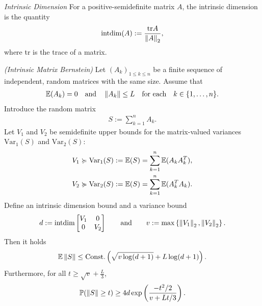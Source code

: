 \begin{definition}
  \emph{Intrinsic Dimension}
  For a positive-semidefinite matrix $A$,
  the intrinsic dimension is the quantity
  \begin{gather*}
    \text{intdim}
    (A)
    :=
    \frac{\text{tr}A}{\left\lVert A\right\rVert_2}
    ,
  \end{gather*}
  where tr is the trace of a matrix.
\end{definition}
\begin{theorem}
  \emph{(Intrinsic Matrix Bernstein)}
  \label{rmineq_bernstein}
  Let $(A_k)_{1\le k \le n}$  be a finite sequence of independent, random matrices with the same size. Assume that
    \begin{gather}
      \mathbb{E}(A_k)=0\quad\text{and}\quad\left\lVert A_k\right\rVert\le L \quad \text{for each}\quad  k\in \{1,\ldots,n\}.
    \end{gather}
  Introduce the random matrix
      \begin{gather*}
        S:=\sum_{k=1}^n A_k.
      \end{gather*}
  Let 
  $V_1$ 
  and
  $V_2$ 
  be semidefinite upper bounds for the matrix-valued variances
  $\text{Var}_1(S)$
  and
  $\text{Var}_2(S)$:
  \begin{align*}
    V_1 
    &\succcurlyeq 
    \text{Var}_1(S)
    :=
    \mathbb{E}(S)
    =
    \sum_{k = 1}^{n}
    \mathbb{E}(A_k A_k^T),\\
    V_2 
    &\succcurlyeq 
    \text{Var}_2(S)
    :=
    \mathbb{E}(S)
    =
    \sum_{k = 1}^{n}
    \mathbb{E}(A_k^T A_k)
    .
  \end{align*}
  Define an intrinsic dimension bound and a variance bound
  \begin{gather}
    \label{ rmineq_intrinsic_bernstein_intdim_var_bound }
    d
    :=
    \text{intdim}
    \begin{bmatrix}
      V_1 & 0 \\
      0   & V_2
    \end{bmatrix}
    \qquad
    \text{and}
    \qquad
    v
    :=
    \max
    \left\{ \left\lVert V_1\right\rVert_2, \left\lVert V_2\right\rVert_2 \right\}
    .
  \end{gather}
  Then 
  it holds
      \begin{align}
        \label{rmineq_intrinsic_bernstein_expectation_bound}
        \mathbb{E}\left\lVert S\right\rVert\le \text{Const.}\left( \sqrt{v\log(d+1)} + L\log(d+1) \right).
      \end{align}
    Furthermore, for all 
  $
    t
    \ge
    \sqrt{v}
    +
    \frac{L}{3}
  $,
      \begin{gather}
        \label{rmineq_intrinsic_bernstein_probability_bound}
        \mathbb{P}(\left\lVert S\right\rVert\ge t)\ge 4d \exp\left(\frac{-t^2/2}{v+Lt/3} \right).
      \end{gather}
\end{theorem}
